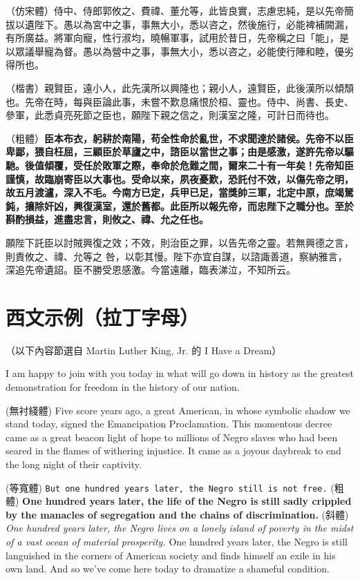 \documentclass[
oneside,
12pt,
]{book}
\begin{document}
（仿宋體）{\fangsong 侍中、侍郎郭攸之、費禕、董允等，此皆良實，志慮忠純，是以先帝簡拔以遺陛下。愚以為宮中之事，事無大小，悉以咨之，然後施行，必能裨補闕漏，有所廣益。將軍向寵，性行淑均，曉暢軍事，試用於昔日，先帝稱之曰「能」，是以眾議舉寵為督。愚以為營中之事，事無大小，悉以咨之，必能使行陣和睦，優劣得所也。}

（楷書）{\kaishu 親賢臣，遠小人，此先漢所以興隆也；親小人，遠賢臣，此後漢所以傾頹也。先帝在時，每與臣論此事，未嘗不歎息痛恨於桓、靈也。侍中、尚書、長史、參軍，此悉貞亮死節之臣也，願陛下親之信之，則漢室之隆，可計日而待也。}

（粗體）\textbf{臣本布衣，躬耕於南陽，苟全性命於亂世，不求聞達於諸侯。先帝不以臣卑鄙，猥自枉屈，三顧臣於草廬之中，諮臣以當世之事；由是感激，遂許先帝以驅馳。後值傾覆，受任於敗軍之際，奉命於危難之間，爾來二十有一年矣！先帝知臣謹慎，故臨崩寄臣以大事也。受命以來，夙夜憂歎，恐託付不效，以傷先帝之明，故五月渡瀘，深入不毛。今南方已定，兵甲已足，當獎帥三軍，北定中原，庶竭駑鈍，攘除奸凶，興復漢室，還於舊都。此臣所以報先帝，而忠陛下之職分也。至於斟酌損益，進盡忠言，則攸之、禕、允之任也。}

願陛下託臣以討賊興復之效；不效，則治臣之罪，以告先帝之靈。若無興德之言，則責攸之、禕、允等之 咎，以彰其慢。陛下亦宜自謀，以諮諏善道，察納雅言，深追先帝遺詔。臣不勝受恩感激。今當遠離，臨表涕泣，不知所云。

\section{西文示例（拉丁字母）}

（以下內容節選自 Martin Luther King, Jr. 的 I Have a Dream）

I am happy to join with you today in what will go down in history as the greatest demonstration for freedom in the history of our nation.

(無衬綫體) \textsf{Five score years ago, a great American, in whose symbolic shadow we stand today, signed the Emancipation Proclamation. This momentous decree came as a great beacon light of hope to millions of Negro slaves who had been seared in the flames of withering injustice. It came as a joyous daybreak to end the long night of their captivity.}

(等寬體) \texttt{But one hundred years later, the Negro still is not free.} (粗體) \textbf{One hundred years later, the life of the Negro is still sadly crippled by the manacles of segregation and the chains of discrimination.} (斜體) \textit{One hundred years later, the Negro lives on a lonely island of poverty in the midst of a vast ocean of material prosperity.} One hundred years later, the Negro is still languished in the corners of American society and finds himself an exile in his own land. And so we've come here today to dramatize a shameful condition.
\end{document}
